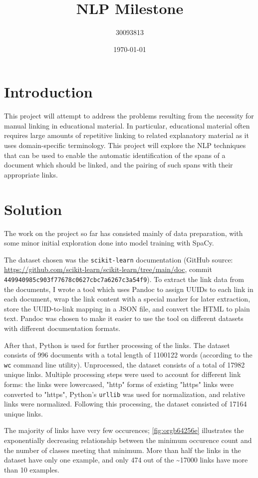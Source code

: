 \documentclass[manuscript,screen,review]{acmart}
\author{30093813}
\date{\today}
\title{NLP Milestone}
\begin{document}
\maketitle
\section*{Introduction}
\label{sec:orga8d7a2c}
This project will attempt to address the problems resulting from the
necessity for manual linking in educational material. In particular,
educational material often requires large amounts of repetitive
linking to related explanatory material as it uses domain-specific
terminology. This project will explore the NLP techniques that can be
used to enable the automatic identification of the spans of a document
which should be linked, and the pairing of such spans with their
appropriate links.

\section*{Solution}
\label{sec:orgcb75316}
The work on the project so far has consisted mainly of data
preparation, with some minor initial exploration done into model
training with SpaCy.

The dataset chosen was the \texttt{scikit-learn} documentation (GitHub source:
\url{https://github.com/scikit-learn/scikit-learn/tree/main/doc}, commit
\texttt{449940985c903f77678c0627cbc7a6267c3a54f9}). To extract the link data
from the documents, I wrote a tool which uses Pandoc to assign UUIDs
to each link in each document, wrap the link content with a special
marker for later extraction, store the UUID-to-link mapping in a JSON
file, and convert the HTML to plain text. Pandoc was chosen to make it
easier to use the tool on different datasets with different
documentation formats.

After that, Python is used for further processing of the links. The
dataset consists of 996 documents with a total length of 1100122 words
(according to the \texttt{wc} command line utility). Unprocessed, the dataset
consists of a total of 17982 unique links. Multiple processing steps
were used to account for different link forms: the links were
lowercased, "http" forms of existing "https" links were converted to
"https", Python's \texttt{urllib} was used for normalization, and relative
links were normalized. Following this processing, the dataset
consisted of 17164 unique links.

The majority of links have very few occurences; \ref{fig:orgb64256e}
illustrates the exponentially decreasing relationship between the
minimum occurence count and the number of classes meeting that
minimum. More than half the links in the dataset have only one
example, and only 474 out of the \textasciitilde 17000 links have more
than 10 examples.
\end{document}
